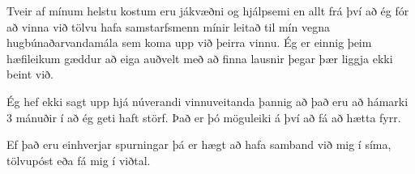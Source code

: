 \documentclass[11pt,a4paper,sans]{moderncv}
\begin{document}
{    Tveir af mínum helstu kostum eru jákvæðni og hjálpsemi en allt frá því að ég fór að vinna við tölvu hafa samstarfsmenn mínir leitað til mín vegna hugbúnaðarvandamála sem koma upp við þeirra vinnu. Ég er einnig þeim hæfileikum gæddur að eiga auðvelt með að finna lausnir þegar þær liggja ekki beint við.

    Ég hef ekki sagt upp hjá núverandi vinnuveitanda þannig að það eru að hámarki 3 mánuðir í að ég geti haft störf. Það er þó möguleiki á því að fá að hætta fyrr.
    
    Ef það eru einhverjar spurningar þá er hægt að hafa samband við mig í síma, tölvupóst eða fá mig í viðtal.
    
    \makeletterclosing
}
\end{document}
